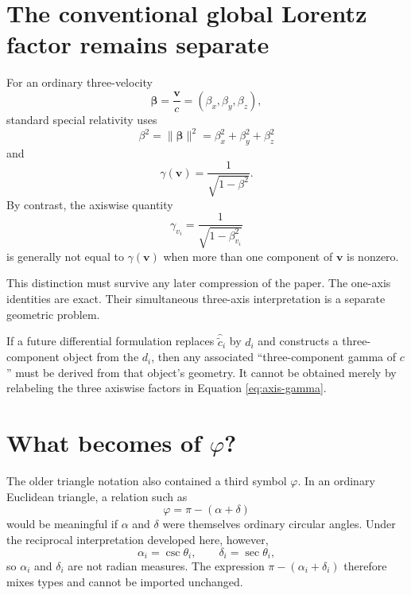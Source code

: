 \documentclass[11pt]{article}
\newcommand{\ccomp}[1]{\widehat{\widetilde{c}}_{#1}}
\begin{document}
\section{The conventional global Lorentz factor remains separate}

For an ordinary three-velocity
\begin{equation}
\boldsymbol{\beta}
=
\frac{\mathbf v}{c}
=
(\beta_x,\beta_y,\beta_z),
\end{equation}
standard special relativity uses
\begin{equation}
\beta^2
=
\lVert\boldsymbol{\beta}\rVert^2
=
\beta_x^2+\beta_y^2+\beta_z^2
\end{equation}
and
\begin{equation}
\gamma(\mathbf v)
=
\frac{1}{\sqrt{1-\beta^2}}.
\label{eq:global-gamma}
\end{equation}
By contrast, the axiswise quantity
\begin{equation}
\gamma_{v_i}
=
\frac{1}{\sqrt{1-\beta_{v_i}^2}}
\label{eq:axis-gamma}
\end{equation}
is generally not equal to $\gamma(\mathbf v)$ when more than one component of
$\mathbf v$ is nonzero.

This distinction must survive any later compression of the paper. The
one-axis identities are exact. Their simultaneous three-axis interpretation
is a separate geometric problem.

If a future differential formulation replaces $\ccomp{i}$ by $d_i$ and
constructs a three-component object from the $d_i$, then any associated
``three-component gamma of $c$'' must be derived from that object's geometry.
It cannot be obtained merely by relabeling the three axiswise factors in
Equation \eqref{eq:axis-gamma}.

\section{What becomes of $\varphi$?}

The older triangle notation also contained a third symbol $\varphi$. In an
ordinary Euclidean triangle, a relation such as
\begin{equation}
\varphi=\pi-(\alpha+\delta)
\end{equation}
would be meaningful if $\alpha$ and $\delta$ were themselves ordinary
circular angles. Under the reciprocal interpretation developed here,
however,
\begin{equation}
\alpha_i=\csc\theta_i,
\qquad
\delta_i=\sec\theta_i,
\end{equation}
so $\alpha_i$ and $\delta_i$ are not radian measures. The expression
$\pi-(\alpha_i+\delta_i)$ therefore mixes types and cannot be imported
unchanged.
\end{document}
